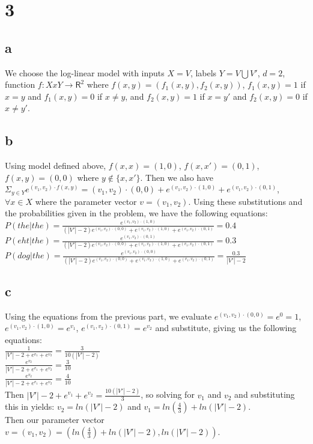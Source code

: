 \documentclass[twoside]{homework}
\begin{document}
\section*{3}
\subsection*{a}
We choose the log-linear model with inputs $X = V$, labels $Y = V \bigcup	V'$, $d = 2$, function $f: X x Y \rightarrow \mathsf{R}^2$ where $f(x,y) = (f_1(x,y),f_2(x,y))$, $f_1(x,y) = 1$ if $x = y$ and $f_1(x,y) = 0$ if $x \neq y$, and   $f_2(x,y) = 1$ if $x = y'$ and $f_2(x,y) = 0$ if $x \neq y'$.
\subsection*{b}
Using model defined above, $f(x,x) = (1,0)$, $f(x,x') = (0,1)$, $f(x,y) = (0,0)$ where $y \notin \{x,x'\}$.  Then we also have $\Sigma_{y \in Y}e^{(v_1,v_2) \cdot f(x,y)} = (v_1,v_2) \cdot (0,0) + e^{(v_1,v_2) \cdot (1,0)} + e^{(v_1,v_2) \cdot (0,1)}$, $\forall x \in X$ where the parameter vector $v = (v_1,v_2)$.  Using these substitutions and the probabilities given in the problem, we have the following equations: \\
$P(the|the) = \frac{e^{(v_1,v_2)\cdot(1,0)}}{(|V'|-2)e^{(v_1,v_2)\cdot(0,0)}+e^{(v_1,v_2)\cdot(1,0)}+e^{(v_1,v_2)\cdot(0,1)}} = 0.4$ \\
$P(eht|the) = \frac{e^{(v_1,v_2)\cdot(0,1)}}{(|V'|-2)e^{(v_1,v_2)\cdot(0,0)}+e^{(v_1,v_2)\cdot(1,0)}+e^{(v_1,v_2)\cdot(0,1)}} = 0.3$ \\
$P(dog|the) = \frac{e^{(v_1,v_2)\cdot(0,0)}}{(|V'|-2)e^{(v_1,v_2)\cdot(0,0)}+e^{(v_1,v_2)\cdot(1,0)}+e^{(v_1,v_2)\cdot(0,1)}} = \frac{0.3}{|V'|-2}$ 
\subsection*{c}
Using the equations from the previous part, we evaluate $e^{(v_1,v_2)\cdot(0,0)} = e^0 = 1$, $e^{(v_1,v_2)\cdot(1,0)} = e^{v_1}$, $e^{(v_1,v_2)\cdot(0,1)} = e^{v_2}$ and substitute, giving us the following equations: \\
$\frac{1}{|V'|-2+e^{v_1}+e^{v_2}} = \frac{3}{10(|V'|-2)}$ \\
$\frac{e^{v_2}}{|V'|-2+e^{v_1}+e^{v_2}} = \frac{3}{10}$ \\
$\frac{e^{v_2}}{|V'|-2+e^{v_1}+e^{v_2}} = \frac{4}{10}$ \\
Then $|V'|-2+e^{v_1}+e^{v_2} = \frac{10(|V'|-2)}{3}$, so solving for $v_1$ and $v_2$ and substituting this in yields: $v_2 = ln(|V'|-2)$ and $v_1 = ln(\frac{4}{3}) + ln(|V'|-2)$. \\
Then our parameter vector $v = (v_1,v_2) = (ln(\frac{4}{3}) + ln(|V'|-2), ln(|V'|-2))$.
\end{document}
